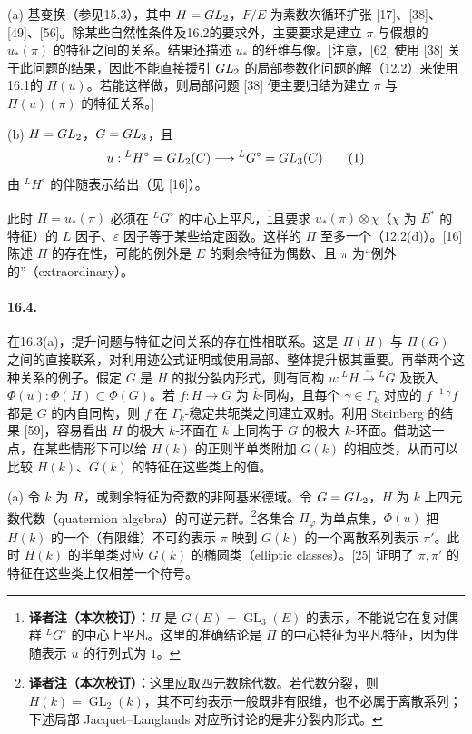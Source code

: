 (a) 基变换（参见15.3），其中 $H=GL_2$，$F/E$ 为素数次循环扩张 [17]、[38]、[49]、[56]。除某些自然性条件及16.2的要求外，主要要求是建立 $\pi$ 与假想的 $u_*(\pi)$ 的特征之间的关系。结果还描述 $u_*$ 的纤维与像。[注意，[62] 使用 [38] 关于此问题的结果，因此不能直接援引 $GL_2$ 的局部参数化问题的解（12.2）来使用16.1的 $\Pi(u)$。若能这样做，则局部问题 [38] 便主要归结为建立 $\pi$ 与 $\Pi(u)(\pi)$ 的特征关系。]

(b) $H=GL_2$，$G=GL_3$，且
\begin{equation}
 u:{}^LH^\circ=GL_2(C)\longrightarrow{}^LG^\circ=GL_3(C)\tag{1}
\end{equation}
由 ${}^LH^\circ$ 的伴随表示给出（见 [16]）。

此时 $\Pi=u_*(\pi)$ 必须在 ${}^LG^\circ$ 的中心上平凡，\footnote{\textbf{译者注（本次校订）：}$\Pi$ 是 $G(E)=\operatorname{GL}_3(E)$ 的表示，不能说它在复对偶群 ${}^LG^\circ$ 的中心上平凡。这里的准确结论是 $\Pi$ 的中心特征为平凡特征，因为伴随表示 $u$ 的行列式为 $1$。}且要求 $u_*(\pi)\otimes\chi$（$\chi$ 为 $E^*$ 的特征）的 $L$ 因子、$\varepsilon$ 因子等于某些给定函数。这样的 $\Pi$ 至多一个（12.2(d)）。[16] 陈述 $\Pi$ 的存在性，可能的例外是 $E$ 的剩余特征为偶数、且 $\pi$ 为“例外的”（extraordinary）。

\paragraph*{16.4.} 在16.3(a)，提升问题与特征之间关系的存在性相联系。这是 $\Pi(H)$ 与 $\Pi(G)$ 之间的直接联系，对利用迹公式证明或使用局部、整体提升极其重要。再举两个这种关系的例子。假定 $G$ 是 $H$ 的拟分裂内形式，则有同构 $u:{}^LH\xrightarrow{\sim}{}^LG$ 及嵌入 $\Phi(u):\Phi(H)\subset\Phi(G)$。若 $f:H\to G$ 为 $\overline k$-同构，且每个 $\gamma\in\Gamma_k$ 对应的 $f^{-1}\,{}^\gamma f$ 都是 $G$ 的内自同构，则 $f$ 在 $\Gamma_k$-稳定共轭类之间建立双射。利用 Steinberg 的结果 [59]，容易看出 $H$ 的极大 $k$-环面在 $k$ 上同构于 $G$ 的极大 $k$-环面。借助这一点，在某些情形下可以给 $H(k)$ 的正则半单类附加 $G(k)$ 的相应类，从而可以比较 $H(k)$、$G(k)$ 的特征在这些类上的值。

(a) 令 $k$ 为 $R$，或剩余特征为奇数的非阿基米德域。令 $G=GL_2$，$H$ 为 $k$ 上四元数代数（quaternion algebra）的可逆元群。\footnote{\textbf{译者注（本次校订）：}这里应取四元数除代数。若代数分裂，则 $H(k)=\operatorname{GL}_2(k)$，其不可约表示一般既非有限维，也不必属于离散系列；下述局部 Jacquet--Langlands 对应所讨论的是非分裂内形式。}各集合 $\Pi_\varphi$ 为单点集，$\Phi(u)$ 把 $H(k)$ 的一个（有限维）不可约表示 $\pi$ 映到 $G(k)$ 的一个离散系列表示 $\pi'$。此时 $H(k)$ 的半单类对应 $G(k)$ 的椭圆类（elliptic classes）。[25] 证明了 $\pi,\pi'$ 的特征在这些类上仅相差一个符号。

